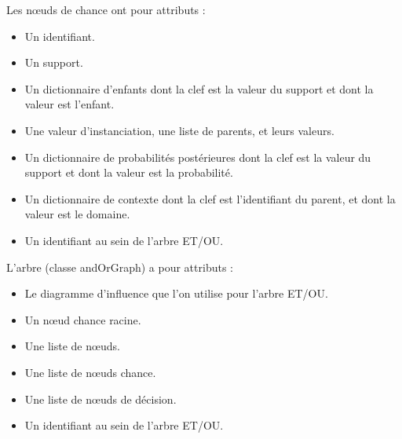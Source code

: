 \documentclass[12pt]{article}
\begin{document}
Les nœuds de chance ont pour attributs :
\begin{itemize}
\item Un identifiant.
\item Un support.
\item Un dictionnaire d'enfants dont la clef est la valeur du support et dont la valeur est l'enfant.
\item Une valeur d'instanciation, une liste de parents, et leurs valeurs.
\item Un dictionnaire de probabilités postérieures dont la clef est la valeur du support et dont la valeur est la probabilité.
\item Un dictionnaire de contexte dont la clef est l'identifiant du parent, et dont la valeur est le domaine.
\item Un identifiant au sein de l'arbre ET/OU.
\end{itemize}

L'arbre (classe andOrGraph) a pour attributs :
\begin{itemize}
\item Le diagramme d'influence que l'on utilise pour l'arbre ET/OU.
\item Un nœud chance racine.
\item Une liste de nœuds.
\item Une liste de nœuds chance.
\item Une liste de nœuds de décision.
\item Un identifiant au sein de l'arbre ET/OU.
\end{itemize}
\end{document}
